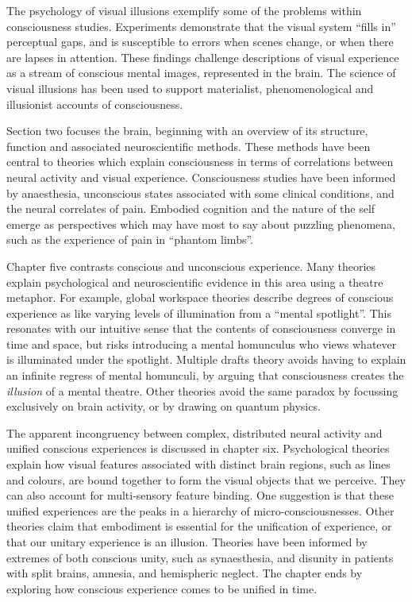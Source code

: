 \documentclass[a4paper]{article}
\begin{document}
The psychology of visual illusions exemplify some of the problems within
consciousness studies. Experiments demonstrate that the visual system ``fills
in'' perceptual gaps, and is susceptible to errors when scenes change, or when
there are lapses in attention. These findings challenge descriptions of visual
experience as a stream of conscious mental images, represented in the brain.
The science of visual illusions has been used to support materialist,
phenomenological and illusionist accounts of consciousness.

Section two focuses the brain, beginning with an overview of its structure,
function and associated neuroscientific methods. These methods have been
central to theories which explain consciousness in terms of correlations
between neural activity and visual experience. Consciousness studies have been
informed by anaesthesia, unconscious states associated with some clinical
conditions, and the neural correlates of pain. Embodied cognition and the
nature of the self emerge as perspectives which may have most to say about
puzzling phenomena, such as the experience of pain in ``phantom limbs''.

Chapter five contrasts conscious and unconscious experience. Many theories
explain psychological and neuroscientific evidence in this area using a
theatre metaphor. For example, global workspace theories describe degrees of
conscious experience as like varying levels of illumination from a ``mental
spotlight''. This resonates with our intuitive sense that the contents of
consciousness converge in time and space, but risks introducing a mental
homunculus who views whatever is illuminated under the spotlight. Multiple
drafts theory avoids having to explain an infinite regress of mental
homunculi, by arguing that consciousness creates the \textit{illusion} of a
mental theatre. Other theories avoid the same paradox by focussing exclusively
on brain activity, or by drawing on quantum physics.

The apparent incongruency between complex, distributed neural activity and
unified conscious experiences is discussed in chapter six. Psychological
theories explain how visual features associated with distinct brain regions,
such as lines and colours, are bound together to form the visual objects that
we perceive. They can also account for multi-sensory feature binding. One
suggestion is that these unified experiences are the peaks in a hierarchy of
micro-consciousnesses. Other theories claim that embodiment is essential for 
the unification of experience, or that our unitary experience is an illusion.
Theories have been informed by extremes of both conscious unity, such as
synaesthesia, and disunity in patients with split brains, amnesia, and
hemispheric neglect. The chapter ends by exploring how conscious experience
comes to be unified in time.
\end{document}
